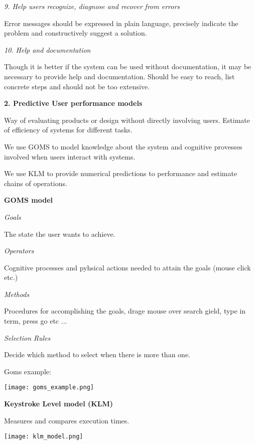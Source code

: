 \textit{9. Help users recognize, diagnose and recover from errors} \smallskip

Error messages should be expressed in plain language, precisely indicate the problem and constructively suggest a solution. \medskip

\textit{10. Help and documentation} \smallskip

Though it is better if the system can be used without documentation, it may be necessary to provide help and documentation. Should be easy to reach, list concrete steps and should not be too extensive. \medskip


\textbf{2. Predictive User performance models} \smallskip

Way of evaluating products or design without directly involving users. Estimate of efficiency of systems for different tasks. \smallskip

We use GOMS to model knowledge about the system and cognitive provesses involved when users interact with systems. \smallskip

We use KLM to provide numerical predictions to performance and estimate chains of operations. \medskip

\columnbreak

\textbf{GOMS model} \smallskip

\textit{Goals} \smallskip

The state the user wants to achieve. \medskip

\textit{Operators} \smallskip

Cognitive processes and pyhsical actions needed to attain the goals (mouse click etc.) \medskip

\textit{Methods} \smallskip

Procedures for accomplishing the goals, drage mouse over search gield, type in term, press go etc ... \medskip

\textit{Selection Rules} \smallskip

Decide which method to select when there is more than one. \smallskip

Goms example:
\begin{center}
	\texttt{[image: goms\_example.png]}
\end{center}

\textbf{Keystroke Level model (KLM)} \smallskip

Measures and compares execution times. 

\begin{center}
	\texttt{[image: klm\_model.png]}
\end{center}

